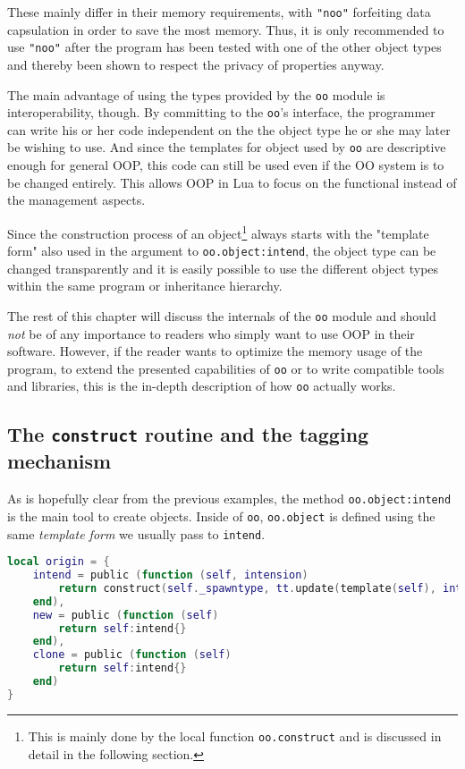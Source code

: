 These mainly differ in their memory requirements, with \texttt{"noo"} forfeiting data capsulation in order to save the most memory. Thus, it is only recommended to use \texttt{"noo"} after the program has been tested with one of the other object types and thereby been shown to respect the privacy of properties anyway.

The main advantage of using the types provided by the \texttt{oo} module is interoperability, though. By committing to the \texttt{oo}'s interface, the programmer can write his or her code independent on the the object type he or she may later be wishing to use. And since the templates for object used by \texttt{oo} are descriptive enough for general OOP, this code can still be used even if the OO system is to be changed entirely. This allows OOP in Lua to focus on the functional instead of the management aspects.

Since the construction process of an object\footnote{This is mainly done by the local function \texttt{oo.construct} and is discussed in detail in the following section.} always starts with the "template form" also used in the argument to \texttt{oo.object:intend}, the object type can be changed transparently and it is easily possible to use the different object types within the same program or inheritance hierarchy.

The rest of this chapter will discuss the internals of the \texttt{oo} module and should \emph{not} be of any importance to readers who simply want to use OOP in their software. However, if the reader wants to optimize the memory usage of the program, to extend the presented capabilities of \texttt{oo} or to write compatible tools and libraries, this is the in-depth description of how \texttt{oo} actually works.

\subsection{The \texttt{construct} routine and the tagging mechanism}

As is hopefully clear from the previous examples, the method \texttt{oo.object:intend} is the main tool to create objects. Inside of \texttt{oo}, \texttt{oo.object} is defined using the same \emph{template form} we usually pass to \texttt{intend}.

\begin{lstlisting}[language=lua, caption={The definition of the methods of \texttt{oo.object} from \texttt{"oo.lua"}}, label=lst:origin, name=lst:origin]
local origin = {
    intend = public (function (self, intension)
        return construct(self._spawntype, tt.update(template(self), intension))
    end),
    new = public (function (self)
        return self:intend{}
    end),
    clone = public (function (self)
        return self:intend{}
    end)
}
\end{lstlisting}


